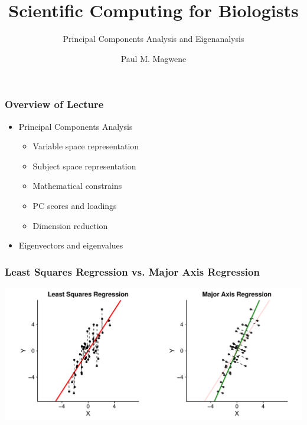 \documentclass{beamer}
\title{Scientific Computing for Biologists}
\subtitle{Principal Components Analysis and Eigenanalysis} %
\author{Paul M. Magwene}
\date{}
\begin{document}
\begin{frame}
\titlepage
\end{frame}

\begin{frame}
  \frametitle{Overview of Lecture}
  
\begin{itemize}
		\item Principal Components Analysis
		\begin{itemize}
			\item Variable space representation
			\item Subject space representation
			\item Mathematical constrains
			\item PC scores and loadings
			\item Dimension reduction			
		\end{itemize}		
		\item Eigenvectors and eigenvalues	
\end{itemize}

\end{frame}


\begin{frame}
  \frametitle{Least Squares Regression vs. Major Axis Regression}

\begin{center}
\includegraphics[width=\textwidth]{fig-lsqr-vs-major-axis.pdf}
\end{center}

\end{frame}
\end{document}
